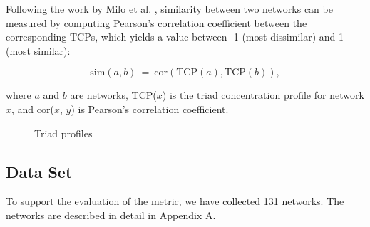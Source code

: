 Following the work by Milo et al. \cite{Milo2002}, similarity between two
networks can be measured by computing Pearson's correlation coefficient between
the corresponding TCPs, which yields a value between -1 (most dissimilar) and 1
(most similar):

$$
\mathrm{sim}(a, b) ~=~ \mathrm{cor}(\mathrm{TCP}(a), \mathrm{TCP}(b))\mathrm{,}
$$

where $a$ and $b$ are networks, TCP($x$) is the triad concentration profile for
network $x$, and cor($x$, $y$) is Pearson's correlation coefficient.

\begin{figure}[!t]
\center
{}
\hfil
{}
\caption{Triad profiles}
\label{fig:profiles}
\end{figure}

\subsection{Data Set}

To support the evaluation of the metric, we have collected 131 networks. The
networks are described in detail in Appendix A.

